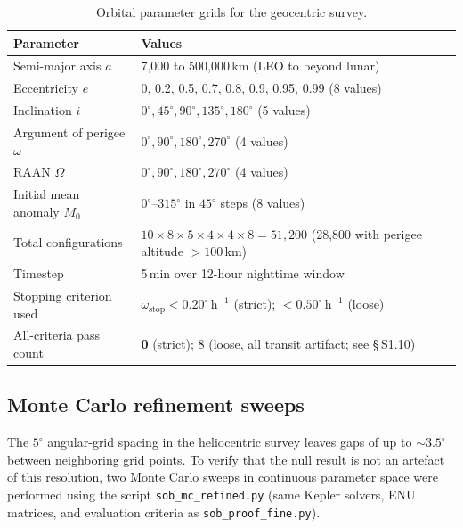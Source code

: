 \documentclass[11pt,a4paper]{article}
\begin{document}
\begin{table}[h]
  \caption{Orbital parameter grids for the geocentric survey.}
  \label{tab:ggrid}
  \centering
  \small
  \begin{tabular}{@{}lp{10cm}@{}}
    \toprule
    Parameter & Values \\
    \midrule
    Semi-major axis $a$ & 7{,}000 to 500{,}000\,km (LEO to beyond lunar) \\
    Eccentricity $e$ & 0, 0.2, 0.5, 0.7, 0.8, 0.9, 0.95, 0.99 (8 values) \\
    Inclination $i$ & $0^\circ, 45^\circ, 90^\circ, 135^\circ, 180^\circ$ (5 values) \\
    Argument of perigee $\omega$ & $0^\circ, 90^\circ, 180^\circ, 270^\circ$ (4 values) \\
    RAAN $\Omega$ & $0^\circ, 90^\circ, 180^\circ, 270^\circ$ (4 values) \\
    Initial mean anomaly $M_0$ & $0^\circ$--$315^\circ$ in $45^\circ$ steps (8 values) \\
    \midrule
    Total configurations & $10 \times 8 \times 5 \times 4 \times 4 \times 8 = 51{,}200$
      (28,800 with perigee altitude $>100$\,km) \\
    Timestep & 5\,min over 12-hour nighttime window \\
    Stopping criterion used & $\omega_\mathrm{stop} < 0.20^\circ\,\mathrm{h}^{-1}$ (strict);
      $< 0.50^\circ\,\mathrm{h}^{-1}$ (loose) \\
    All-criteria pass count & \textbf{0} (strict); 8 (loose, all transit artifact; see \S\,S1.10) \\
    \bottomrule
  \end{tabular}
\end{table}

\subsection{Monte Carlo refinement sweeps}
\label{subsec:mc_refined}

The $5^\circ$ angular-grid spacing in the heliocentric survey leaves gaps
of up to ${\sim}3.5^\circ$ between neighboring grid points.
To verify that the null result is not an artefact of this resolution,
two Monte Carlo sweeps in continuous parameter space were performed using
the script \texttt{sob\_mc\_refined.py} (same Kepler solvers, ENU
matrices, and evaluation criteria as \texttt{sob\_proof\_fine.py}).
\end{document}
